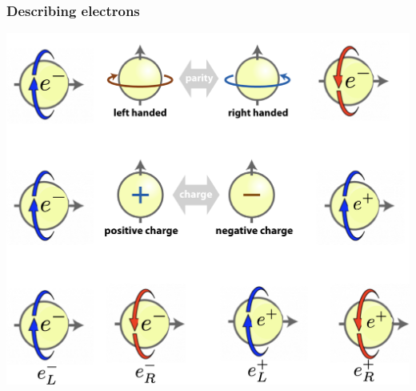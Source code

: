 \begin{frame}
\frametitle{Describing electrons}

\includegraphics[scale=0.3]{img/electronsLR.png}
\end{frame}

%
%


